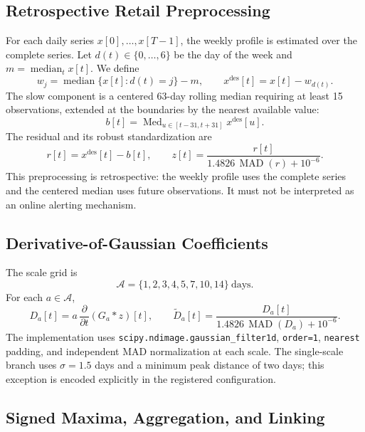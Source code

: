 \documentclass[11pt,a4paper]{article}
\newcommand{\code}[1]{\texttt{#1}}
\newcommand{\MAD}{\operatorname{MAD}}
\begin{document}
\subsection{Retrospective Retail Preprocessing}

For each daily series $x[0],\ldots,x[T-1]$, the weekly profile is estimated over the complete series. Let $d(t)\in\{0,\ldots,6\}$ be the day of the week and $m=\operatorname{median}_t x[t]$. We define
\begin{equation}
 w_j=\operatorname{median}\{x[t]:d(t)=j\}-m,
 \qquad
 x^{\mathrm{des}}[t]=x[t]-w_{d(t)}.
\end{equation}
The slow component is a centered 63-day rolling median requiring at least 15 observations, extended at the boundaries by the nearest available value:
\begin{equation}
 b[t]=\operatorname{Med}_{u\in[t-31,t+31]}x^{\mathrm{des}}[u].
\end{equation}
The residual and its robust standardization are
\begin{equation}
 r[t]=x^{\mathrm{des}}[t]-b[t],
 \qquad
 z[t]=\frac{r[t]}{1.4826\,\MAD(r)+10^{-6}}.
\end{equation}
This preprocessing is retrospective: the weekly profile uses the complete series and the centered median uses future observations. It must not be interpreted as an online alerting mechanism.

\subsection{Derivative-of-Gaussian Coefficients}

The scale grid is
\begin{equation}
 \mathcal{A}=\{1,2,3,4,5,7,10,14\}\ \text{days}.
\end{equation}
For each $a\in\mathcal{A}$,
\begin{equation}
 D_a[t]=a\,\frac{\partial}{\partial t}(G_a*z)[t],
 \qquad
 \widetilde D_a[t]=\frac{D_a[t]}{1.4826\,\MAD(D_a)+10^{-6}}.
\end{equation}
The implementation uses \code{scipy.ndimage.gaussian\_filter1d}, \code{order=1}, \code{nearest} padding, and independent MAD normalization at each scale. The single-scale branch uses $\sigma=1.5$ days and a minimum peak distance of two days; this exception is encoded explicitly in the registered configuration.

\subsection{Signed Maxima, Aggregation, and Linking}
\end{document}
